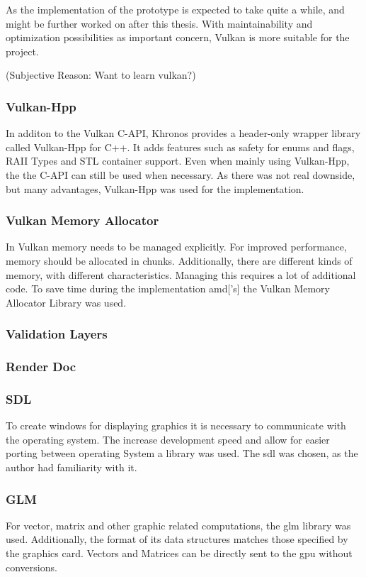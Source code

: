 As the implementation of the prototype is expected to take quite a while, and might be further worked on after this thesis. With maintainability and optimization possibilities as important concern, Vulkan is more suitable for the project.

(Subjective Reason: Want to learn vulkan?)

\subsubsection{Vulkan-Hpp}
In additon to the Vulkan C-API, Khronos provides a header-only wrapper library called Vulkan-Hpp for C++. It adds features such as safety for enums and flags, RAII Types and STL container support. Even when mainly using Vulkan-Hpp, the the C-API can still be used when necessary. As there was not real downside, but many advantages, Vulkan-Hpp was used for the implementation.

\subsubsection{Vulkan Memory Allocator}
In Vulkan memory needs to be managed explicitly. For improved performance, memory should be allocated in chunks. Additionally, there are different kinds of memory, with different characteristics. Managing this requires a lot of additional code. To save time during the implementation \gls{amd}['s] the Vulkan Memory Allocator Library \cite{amd:vulkanmemoryallocator} was used.

\subsubsection{Validation Layers}

\subsubsection{Render Doc}

\subsubsection{SDL}
To create windows for displaying graphics it is necessary to communicate with the operating system. The increase development speed and allow for easier porting between operating System a library was used. The \gls{sdl} \cite{sdl} was chosen, as the author had familiarity with it.

\subsubsection{GLM}
For vector, matrix and other graphic related computations, the \gls{glm} library \cite{glm} was used. Additionally, the format of its data structures matches those specified by the graphics card. Vectors and Matrices can be directly sent to the \gls{gpu} without conversions.


